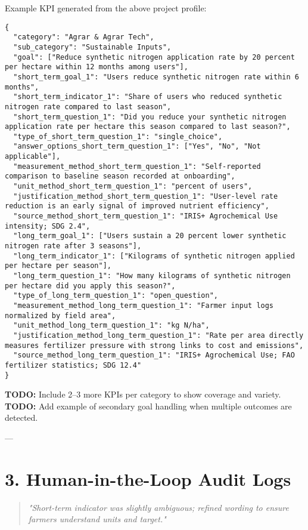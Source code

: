 Example KPI generated from the above project profile:

\begin{verbatim}
{
  "category": "Agrar & Agrar Tech",
  "sub_category": "Sustainable Inputs",
  "goal": ["Reduce synthetic nitrogen application rate by 20 percent per hectare within 12 months among users"],
  "short_term_goal_1": "Users reduce synthetic nitrogen rate within 6 months",
  "short_term_indicator_1": "Share of users who reduced synthetic nitrogen rate compared to last season",
  "short_term_question_1": "Did you reduce your synthetic nitrogen application rate per hectare this season compared to last season?",
  "type_of_short_term_question_1": "single_choice",
  "answer_options_short_term_question_1": ["Yes", "No", "Not applicable"],
  "measurement_method_short_term_question_1": "Self-reported comparison to baseline season recorded at onboarding",
  "unit_method_short_term_question_1": "percent of users",
  "justification_method_short_term_question_1": "User-level rate reduction is an early signal of improved nutrient efficiency",
  "source_method_short_term_question_1": "IRIS+ Agrochemical Use intensity; SDG 2.4",
  "long_term_goal_1": ["Users sustain a 20 percent lower synthetic nitrogen rate after 3 seasons"],
  "long_term_indicator_1": ["Kilograms of synthetic nitrogen applied per hectare per season"],
  "long_term_question_1": "How many kilograms of synthetic nitrogen per hectare did you apply this season?",
  "type_of_long_term_question_1": "open_question",
  "measurement_method_long_term_question_1": "Farmer input logs normalized by field area",
  "unit_method_long_term_question_1": "kg N/ha",
  "justification_method_long_term_question_1": "Rate per area directly measures fertilizer pressure with strong links to cost and emissions",
  "source_method_long_term_question_1": "IRIS+ Agrochemical Use; FAO fertilizer statistics; SDG 12.4"
}
\end{verbatim}

\textbf{TODO:} Include 2–3 more KPIs per category to show coverage and variety.  
\textbf{TODO:} Add example of secondary goal handling when multiple outcomes are detected.

---

\section*{3. Human-in-the-Loop Audit Logs}

\begin{quote}
\textit{"Short-term indicator was slightly ambiguous; refined wording to ensure farmers understand units and target."}
\end{quote}

